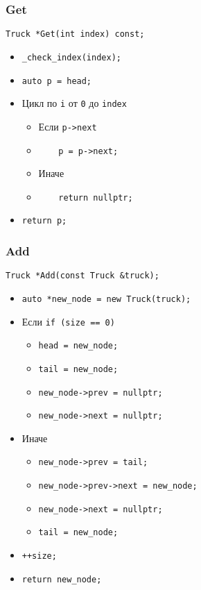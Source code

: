 \subsubsection*{Get}

\begin{lstlisting}
Truck *Get(int index) const;
\end{lstlisting}

\begin{itemize}
	\item \verb|_check_index(index);|
	\item \verb|auto p = head;|
	\item Цикл по \verb|i| от \verb|0| до \verb|index|
	\begin{itemize}
		\item Если \verb|p->next|
		\item \verb|    p = p->next;|
		\item Иначе
		\item \verb|    return nullptr;|
	\end{itemize}
	\item \verb|return p;|
\end{itemize}


\subsubsection*{Add}

\begin{lstlisting}
Truck *Add(const Truck &truck);
\end{lstlisting}

\begin{itemize}
	\item \verb|auto *new_node = new Truck(truck);|
	\item Если \verb|if (size == 0)|
	\begin{itemize}
		\item \verb|head = new_node;|
		\item \verb|tail = new_node;|
		\item \verb|new_node->prev = nullptr;|
		\item \verb|new_node->next = nullptr;|
	\end{itemize}
	\item Иначе
	\begin{itemize}
		\item \verb|new_node->prev = tail;|
		\item \verb|new_node->prev->next = new_node;|
		\item \verb|new_node->next = nullptr;|
		\item \verb|tail = new_node;|
	\end{itemize}
	\item \verb|++size;|
	\item \verb|return new_node;|
\end{itemize}



